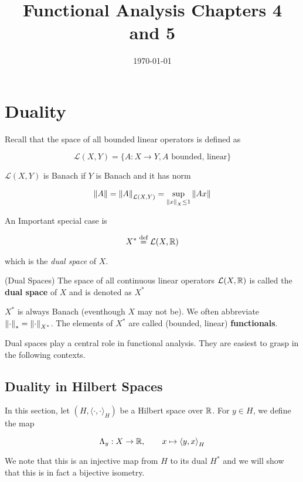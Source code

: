 \documentclass{article}
\title{Functional Analysis Chapters 4 and 5}
\date{\today}
\begin{document}
\maketitle

\section{Duality}  

Recall that the space of all bounded linear operators is defined as

\[
\mathcal{L}(X,Y) = \{A: X \to Y, A \textrm{ bounded, linear}\}
\] 
 
\(\mathcal{L}(X,Y)\) is Banach if  \(Y\) is Banach and it has norm  

\[
\left\|{A}\right\| = \left\|{A}\right\|_{\mathcal{L}(X,Y)} = \sup_{\left\|{x}\right\|_X \leq 1} \left\|{Ax}\right\|
\]  

An Important special case is  

\[
X^* \overset{\textrm{def}}{=} \mathcal{L}(X,\mathbb{R})
\]  

which is the \textit{dual space} of  \(X\).  

\begin{definition}
    (Dual Spaces) The space of all continuous linear operators  \(\mathcal{L}(X, \mathbb{R})\) is called the \textbf{dual space} of  \(X\) and is denoted as   \(X^*\)
\end{definition}  

\begin{remark}
     \(X^*\) is always Banach (eventhough  \(X\) may not be). We often abbreviate  \(\left\|{\cdot}\right\|_* = \left\|{\cdot}\right\|_{X^*}\). The elements of  \(X^*\) are called (bounded, linear) \textbf{functionals}.
\end{remark}

Dual spaces play a central role in functional analysis. They are easiest to grasp in the following contexts.  

\subsection{Duality in Hilbert Spaces}  
In this section, let  \((H, {\langle \cdot, \cdot \rangle}_H )\) be a Hilbert space over  \(\mathbb{R}\). For  \(y\in H\), we define the map  

\begin{equation*}
    \Lambda_y: X \to \mathbb{R}, \qquad x \mapsto {\langle y, x \rangle}_H
\end{equation*}  

We note that this is an injective map from  \(H\) to its dual  \(H^*\) and we will show that this is in fact a bijective isometry.  
\end{document}
